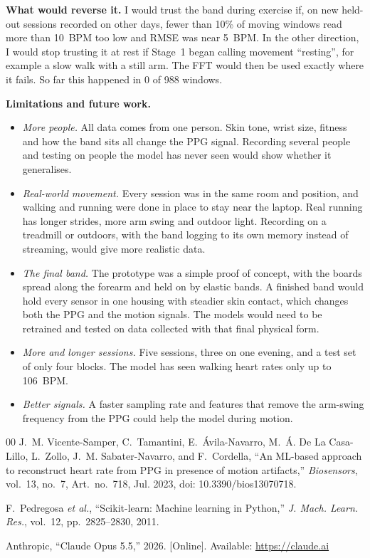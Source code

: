 \documentclass[conference]{IEEEtran}
\begin{document}
\textbf{What would reverse it.} I would trust the band during exercise if, on new held-out sessions recorded on other days, fewer than 10\% of moving windows read more than 10~BPM too low and RMSE was near 5~BPM. In the other direction, I would stop trusting it at rest if Stage~1 began calling movement ``resting'', for example a slow walk with a still arm. The FFT would then be used exactly where it fails. So far this happened in 0 of 988 windows.

\textbf{Limitations and future work.}
\begin{itemize}
\item \emph{More people.} All data comes from one person. Skin tone, wrist size, fitness and how the band sits all change the PPG signal. Recording several people and testing on people the model has never seen would show whether it generalises.
\item \emph{Real-world movement.} Every session was in the same room and position, and walking and running were done in place to stay near the laptop. Real running has longer strides, more arm swing and outdoor light. Recording on a treadmill or outdoors, with the band logging to its own memory instead of streaming, would give more realistic data.
\item \emph{The final band.} The prototype was a simple proof of concept, with the boards spread along the forearm and held on by elastic bands. A finished band would hold every sensor in one housing with steadier skin contact, which changes both the PPG and the motion signals. The models would need to be retrained and tested on data collected with that final physical form.
\item \emph{More and longer sessions.} Five sessions, three on one evening, and a test set of only four blocks. The model has seen walking heart rates only up to 106~BPM.
\item \emph{Better signals.} A faster sampling rate and features that remove the arm-swing frequency from the PPG could help the model during motion.
\end{itemize}

\begin{thebibliography}{00}
J.~M. Vicente-Samper, C.~Tamantini, E.~\'{A}vila-Navarro, M.~\'{A}. De La Casa-Lillo, L.~Zollo, J.~M. Sabater-Navarro, and F.~Cordella, ``An ML-based approach to reconstruct heart rate from PPG in presence of motion artifacts,'' \textit{Biosensors}, vol.~13, no.~7, Art.~no.~718, Jul. 2023, doi: 10.3390/bios13070718.

F.~Pedregosa \textit{et al.}, ``Scikit-learn: Machine learning in Python,'' \textit{J. Mach. Learn. Res.}, vol.~12, pp.~2825--2830, 2011.

Anthropic, ``Claude Opus 5.5,'' 2026. [Online]. Available: \url{https://claude.ai}
\end{thebibliography}
\end{document}
